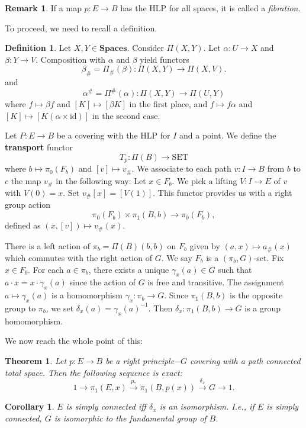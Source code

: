\documentclass{article}
\newtheorem{theorem}{Theorem}[section]
\newtheorem{cor}{Corollary}[section]
\theoremstyle{definition}
\newtheorem{remark}{Remark}
\newtheorem{defn}{Definition}[section]
\newcommand{\cat}[1]{\mathbf{#1}}
\begin{document}
\begin{remark}
If a map $p:E\rightarrow B$ has the HLP for all spaces, it is called a \textit{fibration}.
\end{remark}

To proceed, we need to recall a definition. 
\begin{defn}
Let $X,Y\in\cat{Spaces}.$ Consider $\Pi(X,Y)$. Let $\alpha:U\rightarrow X$ and $\beta:Y\rightarrow V$. Composition with $\alpha$ and $\beta$ yield functors \[\beta_{\#}=\Pi_{\#}(\beta):\Pi(X,Y)\rightarrow\Pi(X,V).\] and 
\[\alpha^{\#}=\Pi^{\#}(\alpha):\Pi(X,Y)\rightarrow\Pi(U,Y)\] where $f\mapsto \beta f$ and $[K]\mapsto[\beta K]$ in the first place, and $f\mapsto f\alpha$ and $[K]\mapsto[K(\alpha\times \text{id})]$ in the second case. 
\end{defn}

Let $P:E\rightarrow B$ be a covering with the HLP for $I$ and a point. We define the \textbf{transport} functor \[T_{p}:\Pi(B)\rightarrow\text{SET} \] where $b\mapsto\pi_{0}(F_{b})$ and $[v]\mapsto v_{\#}$. We associate to each path $v:I\rightarrow B$ from $b$ to $c$ the map $v_{\#}$ in the following way: Let $x\in F_{b}$. We pick a lifting $V:I\rightarrow E$ of $v$ with $V(0)=x$. Set $v_{\#}[x]=[V(1)].$ This functor provides us with a right group action \[\pi_{0}(F_{b})\times\pi_{1}(B,b)\rightarrow\pi_{0}(F_{b}),\] defined as $(x,[v])\mapsto v_{\#}(x).$

There is a left action of $\pi_{b}=\Pi(B)(b,b)$ on $F_{b}$ given by $(a,x)\mapsto a_{\#}(x)$ which commutes with the right action of $G$. We say $F_{b}$ is a $(\pi_{b},G)$-set. Fix $x\in F_{b}$. For each $a\in\pi_{b}$, there exists a unique $\gamma_{x}(a)\in G$ such that $a\cdot x=x\cdot\gamma_{x}(a)$ since the action of $G$ is free and transitive. The assignment $a\mapsto\gamma_{x}(a)$ is a homomorphism $\gamma_{x}:\pi_{b}\rightarrow G$. Since $\pi_{1}(B,b)$ is the opposite group to $\pi_{b}$, we set $\delta_{x}(a)=\gamma_{x}(a)^{-1}$. Then $\delta_{x}:\pi_{1}(B,b)\rightarrow G$ is a group homomorphism. 

We now reach the whole point of this:
\begin{theorem}
Let $p:E\rightarrow B$ be a right principle$-G$ covering with a path connected total space. Then the following sequence is exact:
\[1\rightarrow\pi_{1}(E,x)\xrightarrow{p_{*}}\pi_{1}(B,p(x))\xrightarrow{\delta_{x}}G\rightarrow 1. \]
\end{theorem}
\begin{cor}
$E$ is simply connected iff $\delta_{x}$ is an isomorphism. I.e., if $E$ is simply connected, $G$ is isomorphic to the fundamental group of $B$.
\end{cor}
\end{document}
